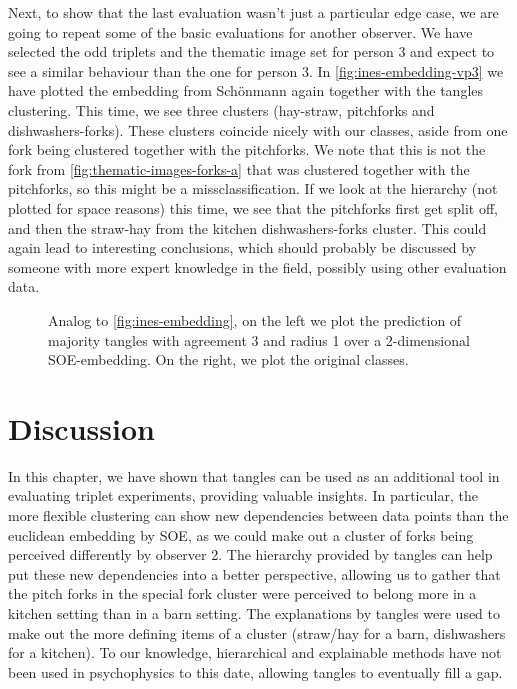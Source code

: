 Next, to show that the last evaluation wasn't just a particular edge case, we are going to repeat some of the basic evaluations for another observer.
We have selected the odd triplets and the thematic image set for person 3 and expect to see a similar behaviour than the one for person 3. In \autoref{fig:ines-embedding-vp3} we have plotted the embedding
from Schönmann again together with the tangles clustering. This time, we see three clusters (hay-straw, pitchforks and dishwashers-forks). These clusters coincide nicely
with our classes, aside from one fork being clustered together with the pitchforks. We note that this is not the fork from \autoref{fig:thematic-images-forks-a} that was clustered together 
with the pitchforks, so this might be a missclassification. 
If we look at the hierarchy (not plotted for space reasons) this time, we see that the pitchforks first get split off, and then the straw-hay from the kitchen dishwashers-forks cluster.
This could again lead to interesting conclusions, which should probably be discussed by someone with more expert knowledge in the field, possibly using other evaluation data.

\onecolumn
\begin{figure}[ht]
    \centering
    \caption{
        Analog to \autoref{fig:ines-embedding}, on the left we plot the prediction of majority tangles with agreement 3 and radius 1 over 
        a 2-dimensional SOE-embedding. On the right, we plot the original classes.
    }
    \label{fig:ines-embedding-vp3}
\end{figure}


\section{Discussion}
In this chapter, we have shown that tangles can be used as an additional tool in evaluating 
triplet experiments, providing valuable insights. In particular, the more flexible clustering 
can show new dependencies between data points than the euclidean embedding by SOE, as we could 
make out a cluster of forks being perceived differently by observer 2. The hierarchy 
provided by tangles can help put these new dependencies into a better perspective, 
allowing us to gather that the pitch forks in the special fork cluster were perceived to 
belong more in a kitchen setting than in a barn setting.
The explanations by tangles were used to make out the more defining items of a cluster (straw/hay for
a barn, dishwashers for a kitchen). To our knowledge, hierarchical and explainable methods
have not been used in psychophysics to this date, allowing tangles to eventually fill 
a gap.

